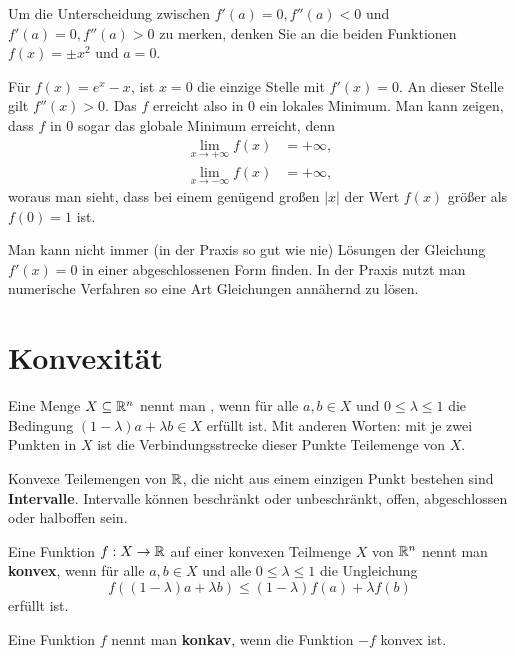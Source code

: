 \begin{bem}
	Um die Unterscheidung zwischen $f'(a) =0, f''(a) <0$ und $f'(a) = 0, f''(a)>0$ zu merken, denken Sie an die beiden Funktionen $f(x) =\pm x^2$ und $a=0$. 
\end{bem} 

\begin{bem}
	Für $f(x) = e^x - x$, ist $x=0$ die einzige Stelle mit $f'(x)=0$. An dieser Stelle gilt $f''(x) > 0$. Das $f$ erreicht also in $0$ ein lokales Minimum. Man kann zeigen, dass $f$ in $0$ sogar das globale Minimum erreicht, denn
	\begin{align*}
		\lim_{x \to +\infty} f(x) & = +\infty, 
	\\	\lim_{x \to -\infty} f(x) & = + \infty,
	\end{align*} 
	woraus man sieht, dass bei einem genügend großen $|x|$ der Wert $f(x)$ größer als $f(0) = 1$ ist. 
\end{bem} 

\begin{bsp}
	Man kann nicht immer (in der Praxis so gut wie nie) Lösungen der Gleichung $f'(x) = 0$ in einer abgeschlossenen Form finden. In der Praxis nutzt man numerische Verfahren so eine Art Gleichungen annähernd zu lösen. 
\end{bsp} 

\section{Konvexität}

\begin{defn} 
	Eine Menge $X \subseteq \mathbb{R}^n$ nennt man , wenn für alle $a,b \in X$ und $0 \le \lambda \le 1$ die Bedingung $(1-\lambda) a + \lambda b \in X$ erfüllt ist. Mit anderen Worten: mit je zwei Punkten in $X$ ist die Verbindungsstrecke dieser Punkte Teilemenge von $X$. 
\end{defn} 

\begin{bem} 
	Konvexe Teilemengen von $\mathbb{R}$, die nicht aus einem einzigen Punkt bestehen sind \textbf{Intervalle}. Intervalle können beschränkt oder unbeschränkt, offen, abgeschlossen oder halboffen sein. 
\end{bem} 


\begin{defn}
	Eine Funktion $f : X \to \mathbb{R}$ auf einer konvexen Teilmenge $X$ von $\mathbb{R}^n$ nennt man \textbf{konvex}, wenn für alle $a,b \in X$ und alle $0 \le \lambda \le 1$ die Ungleichung 
	\[
		f( (1-\lambda) a + \lambda b) \le (1-\lambda) f(a) + \lambda f(b)
	\]
	erfüllt ist. 
	
	Eine Funktion $f$ nennt man \textbf{konkav}, wenn die Funktion $-f$ konvex ist. 
\end{defn} 

